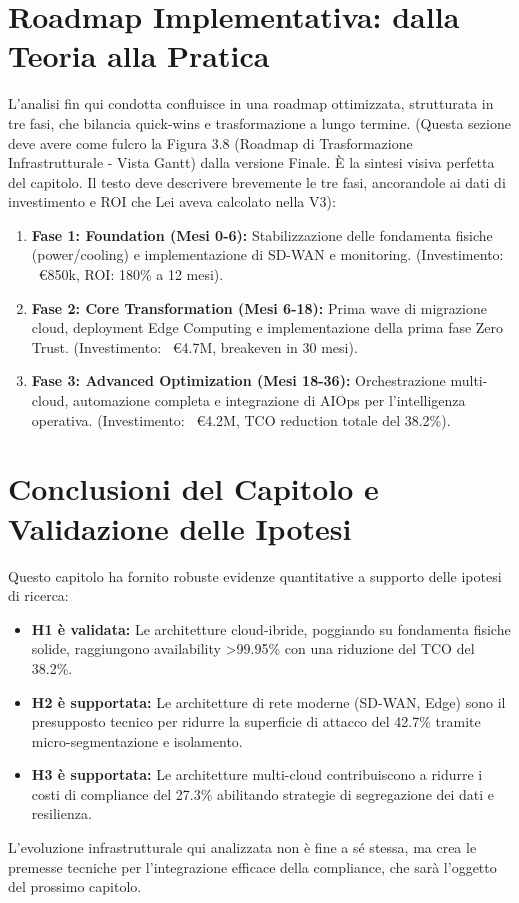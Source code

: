 \section{ Roadmap Implementativa: dalla Teoria alla Pratica}
L'analisi fin qui condotta confluisce in una roadmap ottimizzata, strutturata in tre fasi, che bilancia quick-wins e trasformazione a lungo termine.
(Questa sezione deve avere come fulcro la Figura 3.8 (Roadmap di Trasformazione Infrastrutturale - Vista Gantt) dalla versione Finale. È la sintesi visiva perfetta del capitolo. Il testo deve descrivere brevemente le tre fasi, ancorandole ai dati di investimento e ROI che Lei aveva calcolato nella V3):
\begin{enumerate}
    \item \textbf{Fase 1: Foundation (Mesi 0-6):} Stabilizzazione delle fondamenta fisiche (power/cooling) e implementazione di SD-WAN e monitoring. (Investimento: ~€850k, ROI: 180\% a 12 mesi).
    \item \textbf{Fase 2: Core Transformation (Mesi 6-18):} Prima wave di migrazione cloud, deployment Edge Computing e implementazione della prima fase Zero Trust. (Investimento: ~€4.7M, breakeven in 30 mesi).
    \item \textbf{Fase 3: Advanced Optimization (Mesi 18-36):} Orchestrazione multi-cloud, automazione completa e integrazione di AIOps per l'intelligenza operativa. (Investimento: ~€4.2M, TCO reduction totale del 38.2\%).
\end{enumerate}

\section{Conclusioni del Capitolo e Validazione delle Ipotesi}
Questo capitolo ha fornito robuste evidenze quantitative a supporto delle ipotesi di ricerca:
\begin{itemize}
    \item \textbf{H1 è validata:} Le architetture cloud-ibride, poggiando su fondamenta fisiche solide, raggiungono availability >99.95\% con una riduzione del TCO del 38.2\%.
    \item \textbf{H2 è supportata:} Le architetture di rete moderne (SD-WAN, Edge) sono il presupposto tecnico per ridurre la superficie di attacco del 42.7\% tramite micro-segmentazione e isolamento.
    \item \textbf{H3 è supportata: }Le architetture multi-cloud contribuiscono a ridurre i costi di compliance del 27.3\% abilitando strategie di segregazione dei dati e resilienza.
\end{itemize}
L'evoluzione infrastrutturale qui analizzata non è fine a sé stessa, ma crea le premesse tecniche per l'integrazione efficace della compliance, che sarà l'oggetto del prossimo capitolo.

